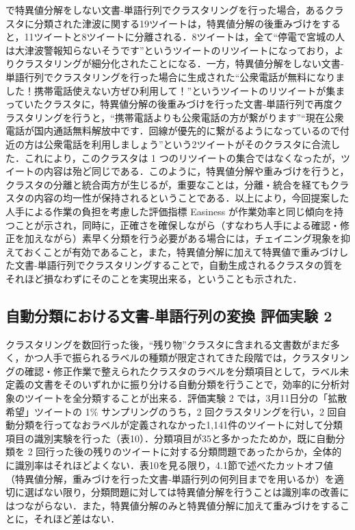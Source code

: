 \documentclass[japanese]{jnlp_1.4}
\begin{document}
で特異値分解をしない文書‐単語行列でクラスタリングを行った場合，あるクラスタに分類された津波に関する19ツイートは，特異値分解の後重みづけをすると，11ツイートと8ツイートに分離される．8ツイートは，全て``停電で宮城の人は大津波警報知らないそうです''というツイートのリツイートになっており，よりクラスタリングが細分化されたことになる．一方，特異値分解をしない文書‐単語行列でクラスタリングを行った場合に生成された``公衆電話が無料になりました！携帯電話使えない方ぜひ利用して！''というツイートのリツイートが集まっていたクラスタに，特異値分解の後重みづけを行った文書‐単語行列で再度クラスタリングを行うと，``携帯電話よりも公衆電話の方が繋がります''``現在公衆電話が国内通話無料解放中です．回線が優先的に繋がるようになっているので付近の方は公衆電話を利用しましょう''という2ツイートがそのクラスタに合流した．これにより，このクラスタは 1 つのリツイートの集合ではなくなったが，ツイートの内容は殆ど同じである．このように，特異値分解や重みづけを行うと，クラスタの分離と統合両方が生じるが，重要なことは，分離・統合を経てもクラスタの内容の均一性が保持されるということである．以上により，今回提案した人手による作業の負担を考慮した評価指標 Easiness が作業効率と同じ傾向を持つことが示され，同時に，正確さを確保しながら（すなわち人手による確認・修正を加えながら）素早く分類を行う必要がある場合には，チェイニング現象を抑えておくことが有効であること，また，特異値分解に加えて特異値で重みづけした文書‐単語行列でクラスタリングすることで，自動生成されるクラスタの質をそれほど損なわずにそのことを実現出来る，ということも示された．



\subsection{自動分類における文書‐単語行列の変換 評価実験 2}

クラスタリングを数回行った後，``残り物''クラスタに含まれる文書数がまだ多く，かつ人手で振られるラベルの種類が限定されてきた段階では，クラスタリングの確認・修正作業で整えられたクラスタのラベルを分類項目として，ラベル未定義の文書をそのいずれかに振り分ける自動分類を行うことで，効率的に分析対象のツイートを全分類することが出来る．評価実験 2 では，3月11日分の「拡散希望」ツイートの 1\% サンプリングのうち，2 回クラスタリングを行い，2 回自動分類を行ってなおラベルが定義されなかった1,141件のツイートに対して分類項目の識別実験を行った（表10）．分類項目が35と多かったためか，既に自動分類を 2 回行った後の残りのツイートに対する分類問題であったからか，全体的に識別率はそれほどよくない．表10を見る限り，4.1節で述べたカットオフ値（特異値分解，重みづけを行った文書‐単語行列の何列目までを用いるか）を適切に選ばない限り，分類問題に対しては特異値分解を行うことは識別率の改善にはつながらない．また，特異値分解のみと特異値分解に加えて重みづけをすることに，それほど差はない．
\end{document}
